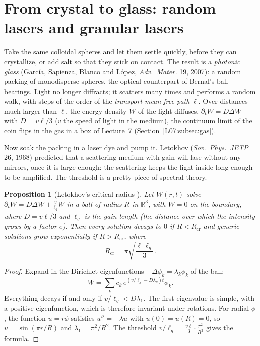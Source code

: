 \documentclass[11pt,openany]{book}
\theoremstyle{plain}
\newtheorem{proposition}[theorem]{Proposition}
\theoremstyle{definition}
\theoremstyle{remark}
\newcommand{\R}{\mathbb{R}}
\begin{document}
\section{From crystal to glass: random lasers and granular lasers}
\label{PHYS:sec:laser}

Take the same colloidal spheres and let them settle quickly, before they can crystallize, or add salt so
that they stick on contact. The result is a \emph{photonic glass} (Garc\'ia, Sapienza, Blanco and L\'opez,
\emph{Adv.\ Mater.} 19, 2007): a random packing of monodisperse spheres, the optical counterpart of Bernal's
ball bearings. Light no longer diffracts; it scatters many times and performs a random walk, with steps
of the order of the \emph{transport mean free path} $\ell$. Over distances much larger than $\ell$, the
energy density $W$ of the light diffuses, $\partial_tW=D\Delta W$ with $D=v\ell/3$ ($v$ the speed of light in
the medium), the continuum limit of the coin flips in the gas in a box of Lecture~7
(Section~\ref{L07:subsec:gas}).

Now soak the packing in a laser dye and pump it. Letokhov (\emph{Sov.\ Phys.\ JETP} 26, 1968) predicted
that a scattering medium with gain will lase without any mirrors, once it is large enough: the
scattering keeps the light inside long enough to be amplified. The threshold is a pretty piece of
spectral theory.

\begin{proposition}[Letokhov's critical radius ]\label{PHYS:prop:letokhov}
Let $W(r,t)$ solve $\partial_tW=D\Delta W+\frac v{\ell_g}W$ in a ball of radius $R$ in $\R^3$, with $W=0$ on the
boundary, where $D=v\ell/3$ and $\ell_g$ is the gain length (the distance over which the intensity grows
by a factor $e$). Then every solution decays to $0$ if $R<R_{\mathrm{cr}}$ and generic solutions grow
exponentially if $R>R_{\mathrm{cr}}$, where
\[
  R_{\mathrm{cr}}=\pi\sqrt{\frac{\ell\,\ell_g}3}.
\]
\end{proposition}

\begin{proof}
Expand in the Dirichlet eigenfunctions $-\Delta\phi_k=\lambda_k\phi_k$ of the ball:
\[
  W=\sum_kc_k\,e^{(v/\ell_g-D\lambda_k)t}\phi_k .
\]
Everything decays if and only if $v/\ell_g<D\lambda_1$. The first
eigenvalue is simple, with a positive eigenfunction, which is therefore invariant under rotations. For
radial $\phi$, the function $u=r\phi$ satisfies $u''=-\lambda u$ with $u(0)=u(R)=0$, so $u=\sin(\pi r/R)$ and
$\lambda_1=\pi^2/R^2$. The threshold $v/\ell_g=\frac{v\ell}3\cdot\frac{\pi^2}{R^2}$ gives the formula.
\end{proof}
\end{document}
